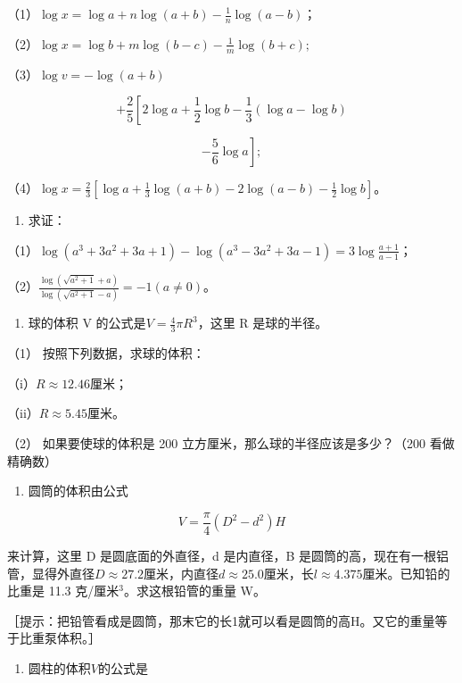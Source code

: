 （1）\(\log x = \log a + n\log (a + b) - \frac{1}{n}\log (a - b)\)；

（2）\(\log x = \log b + m\log (b - c) - \frac{1}{m}\log (b + c);\)

（3）\(\log v = -\log (a + b)\)

\[
+ \frac{2}{5} \left[ 2 \log a + \frac{1}{2} \log b - \frac{1}{3} (\log a - \log b) \right.
\]

\[
\left. - \frac{5}{6} \log a \right];
\]

（4）\(\log x = \frac{2}{3}\left[\log a + \frac{1}{3}\log (a + b) - 2\log (a - b) - \frac{1}{2}\log b\right]\)。

\begin{enumerate}[start=11]
\item
  求证：
\end{enumerate}

（1）\(\log (a^3 + 3a^2 + 3a + 1) - \log (a^3 - 3a^2 + 3a - 1) = 3\log \frac{a + 1}{a - 1}\)；

（2）\(\frac{\log(\sqrt{a^2 + 1} + a)}{\log(\sqrt{a^2 + 1} - a)} = -1 (a \neq 0)\)。

\begin{enumerate}[start=12]
\item
  球的体积 V 的公式是\(V = \frac{4}{3} \pi R^{3}\)，这里 R 是球的半径。
\end{enumerate}

（1） 按照下列数据，求球的体积：

（i）\(R \approx 12.46\)厘米；

（ii）\(R \approx 5.45\)厘米。

（2） 如果要使球的体积是 200 立方厘米，那么球的半径应该是多少？（200
看做精确数）

\begin{enumerate}[start=13]
\item
  圆筒的体积由公式
\end{enumerate}

\[
V = \frac{\pi}{4} (D^{2} - d^{2}) H
\]

来计算，这里 D 是圆底面的外直径，d 是内直径，B
是圆筒的高，现在有一根铝管，显得外直径\(D \approx 27.2\)厘米，内直径\(d \approx 25.0\)厘米，长\(l \approx 4.375\)厘米。已知铅的比重是
11.3 克/厘米\(^{3}\)。求这根铅管的重量 W。

［提示：把铅管看成是圆筒，那末它的长1就可以看是圆筒的高H。又它的重量等于比重泵体积。］

\begin{enumerate}[start=14]
\item
  圆柱的体积\(V\)的公式是
\end{enumerate}

